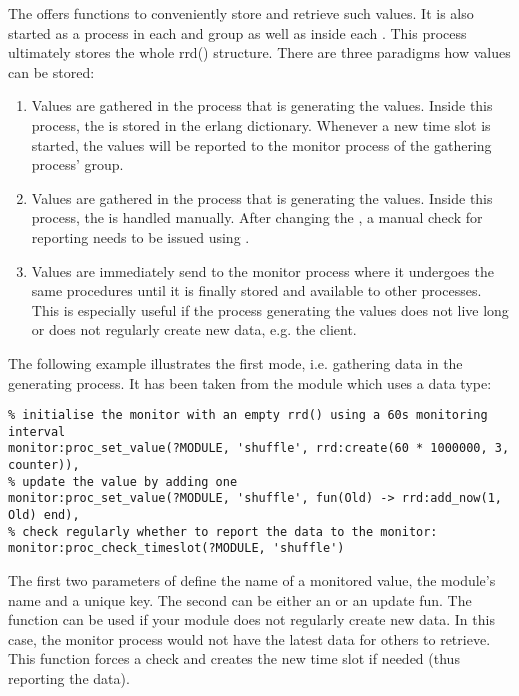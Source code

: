 The  offers functions to conveniently store and retrieve
such values. It is also started as a process in each  and
 group as well as inside each .
This process ultimately stores the whole rrd() structure.
There are three paradigms how values can be stored:
\begin{enumerate}
  \item Values are gathered in the process that is generating the values.
        Inside this process, the  is stored in the erlang
        dictionary.
        Whenever a new time slot is started, the values will be
        reported to the monitor process of the gathering process' group.
  \item Values are gathered in the process that is generating the values.
        Inside this process, the  is handled manually.
        After changing the , a manual check for reporting needs to
        be issued using .
  \item Values are immediately send to the monitor process where it undergoes
        the same procedures until it is finally stored and available to other
        processes. This is especially useful if the process generating the
        values does not live long or does not regularly create new data, e.g.
        the client.
\end{enumerate}

The following example illustrates the first mode, i.e. gathering data in the
generating process. It has been taken from the  module which
uses a  data type:

\begin{lstlisting}
% initialise the monitor with an empty rrd() using a 60s monitoring interval
monitor:proc_set_value(?MODULE, 'shuffle', rrd:create(60 * 1000000, 3, counter)),
% update the value by adding one
monitor:proc_set_value(?MODULE, 'shuffle', fun(Old) -> rrd:add_now(1, Old) end),
% check regularly whether to report the data to the monitor:
monitor:proc_check_timeslot(?MODULE, 'shuffle')
\end{lstlisting}

The first two parameters of  define the
name of a monitored value, the module's name and a unique key. The second can
be either an  or an update fun.
The  function can be used if your
module does not regularly create new data. In this case, the monitor process
would not have the latest data for others to retrieve. This function forces a
check and creates the new time slot if needed (thus reporting the data).


